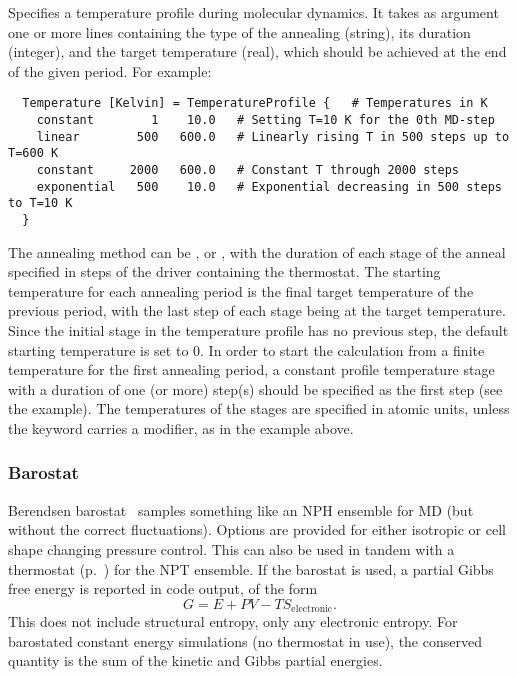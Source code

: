 Specifies a temperature profile during molecular dynamics. It takes as
argument one or more lines containing the type of the annealing
(string), its duration (integer), and the target temperature (real),
which should be achieved at the end of the given period. For example:
\begin{verbatim}
  Temperature [Kelvin] = TemperatureProfile {   # Temperatures in K
    constant        1    10.0   # Setting T=10 K for the 0th MD-step
    linear        500   600.0   # Linearly rising T in 500 steps up to T=600 K
    constant     2000   600.0   # Constant T through 2000 steps
    exponential   500    10.0   # Exponential decreasing in 500 steps to T=10 K
  }
\end{verbatim}
The annealing method can be ,  or
, with the duration of each stage of the anneal
specified in steps of the driver containing the thermostat. The
starting temperature for each annealing period is the final target
temperature of the previous period, with the last step of each stage
being at the target temperature. Since the initial stage in the
temperature profile has no previous step, the default starting
temperature is set to 0.  In order to start the calculation from a finite
temperature for the first annealing period, a constant profile
temperature stage with a duration of one (or more) step(s) should be
specified as the first step (see the example).  The temperatures of
the stages are specified in atomic units, unless the 
keyword carries a modifier, as in the example above.

\subsubsection{Barostat}
\label{sec:dftbp.Barostat}

Berendsen barostat~\cite{berendsen-JCP-81-3684} samples something like an
NPH ensemble for MD (but without the correct
fluctuations). Options are provided for either isotropic or cell shape changing
pressure control. This can also be used in tandem with a thermostat
(p.~) for the NPT ensemble. If the barostat
is used, a partial Gibbs free energy is reported in code output, of the form
$$G = E + PV - TS_\mathrm{electronic}.$$ This does not include structural
entropy, only any electronic entropy. For barostated constant energy simulations
(no thermostat in use), the conserved quantity is the sum of the kinetic and
Gibbs partial energies.

